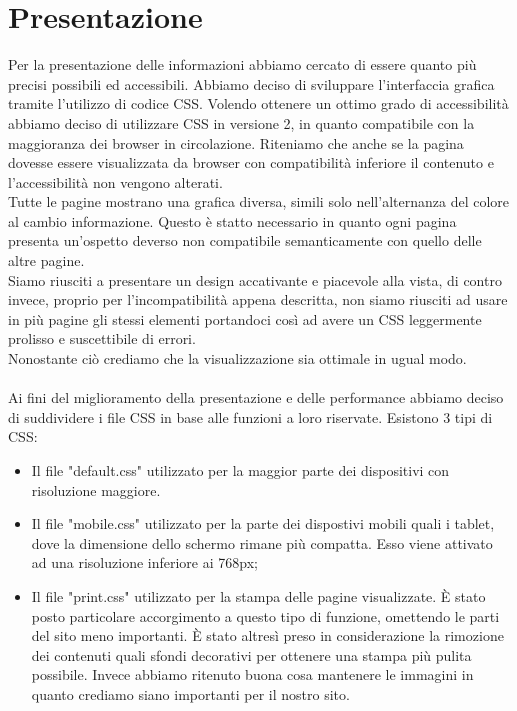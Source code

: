 \documentclass[11pt]{article}
\begin{document}
\section{Presentazione}
Per la presentazione delle informazioni abbiamo cercato di essere quanto più precisi possibili ed accessibili. Abbiamo deciso di sviluppare l'interfaccia grafica tramite l'utilizzo di codice CSS. Volendo ottenere un ottimo grado di accessibilità abbiamo deciso di utilizzare CSS in versione 2, in quanto compatibile con la maggioranza dei browser in circolazione.
Riteniamo che anche se la pagina dovesse essere visualizzata da browser con compatibilità inferiore il contenuto e l'accessibilità non vengono alterati.
\\
Tutte le pagine mostrano una grafica diversa, simili solo nell'alternanza del colore al cambio informazione. Questo è statto necessario in quanto ogni pagina presenta un'ospetto deverso non compatibile semanticamente con quello delle altre pagine.
\\ Siamo riusciti a presentare un design accativante e piacevole alla vista, di contro invece,  proprio per l'incompatibilità appena descritta, non siamo riusciti ad usare in più pagine gli stessi elementi portandoci così ad avere un CSS leggermente prolisso e suscettibile di errori. 
\\Nonostante ciò crediamo che la visualizzazione sia ottimale in ugual modo. 
\\
\\
Ai fini del miglioramento della presentazione e delle performance abbiamo deciso di suddividere i file CSS in base alle funzioni a loro riservate. Esistono 3 tipi di CSS:
\begin{itemize}
	\item Il file "default.css" utilizzato per la maggior parte dei dispositivi con risoluzione maggiore.
	\item Il file "mobile.css" utilizzato per la parte dei dispostivi mobili quali i tablet, dove la dimensione dello schermo rimane più compatta. Esso viene attivato ad una risoluzione inferiore ai 768px;
	\item Il file "print.css" utilizzato per la stampa delle pagine visualizzate. È stato posto particolare accorgimento a questo tipo di funzione, omettendo le parti del sito meno importanti. È stato altresì preso in considerazione la rimozione dei contenuti quali sfondi decorativi per ottenere una stampa più pulita possibile. Invece abbiamo ritenuto buona cosa mantenere le immagini in quanto crediamo siano importanti per il nostro sito.
	
\end{itemize}
\end{document}
